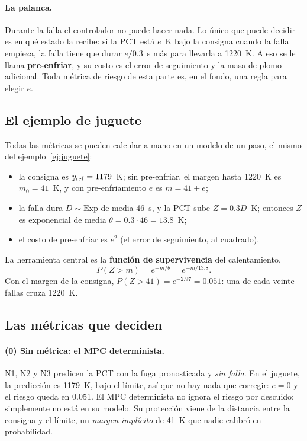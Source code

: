 \paragraph{La palanca.} Durante la falla el controlador no puede hacer nada. Lo único que puede
decidir es en qué estado la recibe: si la PCT está $e$~K bajo la consigna cuando la falla empieza,
la falla tiene que durar $e/0.3$~s más para llevarla a 1220~K. A eso se le llama
\textbf{pre-enfriar}, y su costo es el error de seguimiento y la masa de plomo adicional. Toda
métrica de riesgo de esta parte es, en el fondo, una regla para elegir $e$.

\subsection{El ejemplo de juguete}\label{sec:riesgo-juguete}
Todas las métricas se pueden calcular a mano en un modelo de un paso, el mismo del
ejemplo~\ref{ej:juguete}:
\begin{itemize}
  \item la consigna es $y_{\rm ref}=1179$~K; sin pre-enfriar, el margen hasta 1220~K es
        $m_0=41$~K, y con pre-enfriamiento $e$ es $m=41+e$;
  \item la falla dura $D\sim\mathrm{Exp}$ de media 46~s, y la PCT sube $Z=0.3D$~K; entonces $Z$ es
        exponencial de media $\theta=0.3\cdot46=13.8$~K;
  \item el costo de pre-enfriar es $e^2$ (el error de seguimiento, al cuadrado).
\end{itemize}
La herramienta central es la \textbf{función de supervivencia} del calentamiento,
\[
P(Z>m)=e^{-m/\theta}=e^{-m/13.8}.
\]
Con el margen de la consigna, $P(Z>41)=e^{-2.97}=0.051$: una de cada veinte fallas cruza 1220~K.

\subsection{Las métricas que deciden}\label{sec:riesgo-metricas-decision}
\paragraph{(0) Sin métrica: el MPC determinista.} N1, N2 y N3 predicen la PCT con la fuga
pronosticada y \emph{sin falla}. En el juguete, la predicción es 1179~K, bajo el límite, así que
no hay nada que corregir: $e=0$ y el riesgo queda en 0.051. El MPC determinista no ignora el
riesgo por descuido; simplemente no está en su modelo. Su protección viene de la distancia entre
la consigna y el límite, un \emph{margen implícito} de 41~K que nadie calibró en probabilidad.

